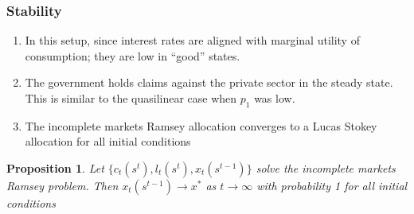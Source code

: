\documentclass{beamer}
\newcommand{\EE}{\mathbb E}
\newtheorem{proposition}{Proposition}
\begin{document}
%
%
%
\begin{frame}
	\frametitle{Stability}
	\begin{enumerate}
	 \item In this setup, since interest rates are aligned with marginal utility of consumption;  they are low  in ``good'' states. 
	 \item The government holds claims against the private sector in the steady state. This is similar to the quasilinear case when $p_1$ was low.	 
	 \item The incomplete markets Ramsey allocation converges to a Lucas Stokey allocation for all initial conditions	 	
	\end{enumerate}


	\begin{proposition}  Let $\{c_t(s^t), l_t(s^t), x_t(s^{t-1})\}$ solve the incomplete markets Ramsey problem.  Then  $x_t(s^{t-1})\rightarrow x^*$ as $t\rightarrow \infty$ with probability 1 for all initial conditions
	
	\end{proposition}
	\end{frame}
	
\end{document}
